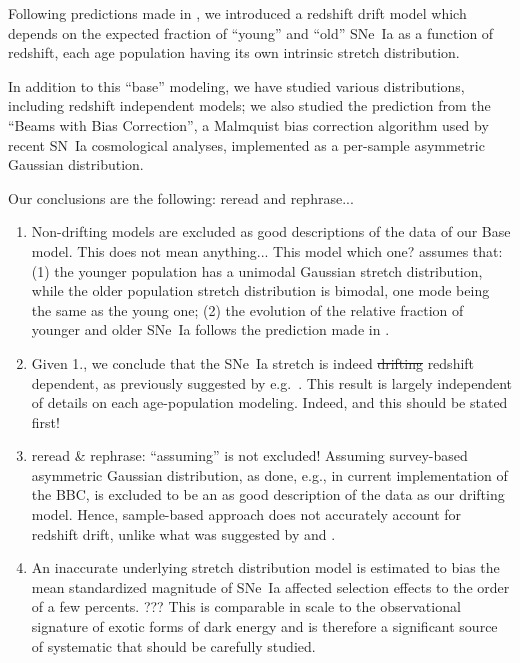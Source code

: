 \documentclass[]{aa} %
\newcommand{\mr}[1]{{\textcolor[rgb]{0.60,0.10,0.6}{#1}}}
\newcommand{\yc}[1]{{\textcolor{BrickRed}{#1}}}
\begin{document}
Following \yc{predictions} made in \cite{rigault2018}, we introduced a redshift
drift model which depends on the expected fraction of ``young'' and ``old'' SNe~Ia as
a function of redshift, each age population having its own \yc{intrinsic} stretch distribution.

In addition to this ``base'' modeling, we have studied various distributions, including \yc{redshift independent} models; we also studied the prediction from the ``Beams
with Bias Correction'', a Malmquist bias correction algorithm used by recent SN~Ia cosmological analyses, \yc{implemented as a} per-sample asymmetric Gaussian distribution.

Our conclusions are the following: \yc{reread and rephrase...}
\begin{enumerate}
    \item Non-drifting models are excluded as good descriptions of the data of
        our Base model. \yc{This does not mean anything...} This model \yc{which one?} assumes that: (1) the younger population has
        a unimodal Gaussian stretch distribution, while the older population
        stretch \yc{distribution} is bimodal, one mode being the same as the young one; (2)
        the evolution of the relative fraction of younger and older SNe~Ia
        follows the prediction made in \cite{rigault2018}. 

    \item Given 1., we conclude that the SNe~Ia stretch is indeed \yc{\sout{drifting} redshift dependent}, as previously suggested by e.g.~\cite{howell2007}. \mr{This result is largely independent of details on each age-population modeling.} \yc{Indeed, and this should be stated first!}

    \item \yc{reread \& rephrase: ``assuming'' is not excluded!} \mr{Assuming survey-based asymmetric
        Gaussian distribution, as done, e.g., in current implementation of the BBC, is excluded to be an as good description of the
        data as our drifting model}. Hence, sample-based approach does not accurately account for redshift drift, unlike what was suggested by
        \cite{scolnic2016} and \cite{scolnic2018a}.

    \item An inaccurate underlying stretch distribution model is estimated to
        bias the mean standardized magnitude of SNe~Ia affected selection
        effects to the order of a few percents. \yc{???} This is comparable in scale to
        the observational signature of exotic forms of dark energy and is
        therefore a significant source of systematic that should be carefully
        studied.


\end{enumerate}
\end{document}
